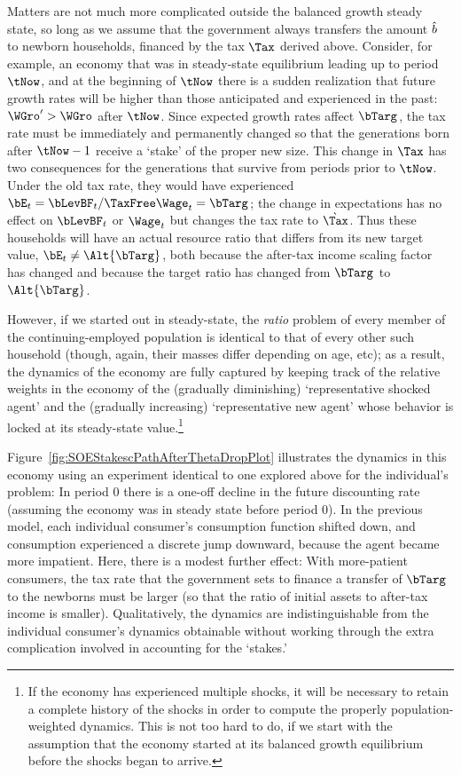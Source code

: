 \documentclass{handout}
\begin{document}
Matters are not much more complicated outside the balanced growth
steady state, so long as we assume that the government always
transfers the amount $\hat{b}^{\null}$ to newborn households, financed by
the tax $\Tax$ derived above.  Consider, for example, an economy that
was in steady-state equilibrium leading up to period $\tNow$, and at
the beginning of $\tNow$ there is a sudden realization that future
growth rates will be higher than those anticipated and experienced in
the past: $\WGro^{\prime} > \WGro$ after $\tNow$.  Since expected
growth rates affect $\bTarg^{\null}$, the tax rate must be immediately and
permanently changed so that the generations born after $\tNow-1$
receive a `stake' of the proper new size.  This change in $\Tax$ has
two consequences for the generations that survive from periods prior
to $\tNow$.  Under the old tax rate, they would have experienced
$\bE_{t} = \bLevBF_{t}/\TaxFree\Wage_{t} = \bTarg^{\null}$; the change in
expectations has no effect on $\bLevBF_{t}$ or $\Wage_{t}$ but changes
the tax rate to $\grave{\Tax}$.  Thus these households will have an
actual resource ratio that differs from its new target value, $\bE_{t}
\neq \Alt{\bTarg}^{\null}$, both because the after-tax income scaling factor
has changed and because the target ratio has changed from $\bTarg^{\null}$
to $\Alt{\bTarg}^{\null}$.

However, if we started out in steady-state, the {\it ratio} problem of every
member of the continuing-employed population is identical to that of every 
other such household (though, again, their masses differ depending on age, etc); as a result, the dynamics of the economy are fully captured
by keeping track of the relative weights in the economy of the (gradually diminishing) `representative shocked agent' and the (gradually increasing) `representative new agent' 
whose behavior is locked at its steady-state value.\footnote{
If the economy has experienced multiple shocks, it will be necessary to
retain a complete history of the shocks in order to compute the properly 
population-weighted dynamics.  This is not too hard to do, if we start with
the assumption that the economy started at its balanced growth equilibrium before the shocks began to arrive.}

Figure~\ref{fig:SOEStakescPathAfterThetaDropPlot} illustrates the
dynamics in this economy using an experiment identical to one explored
above for the individual's problem: In period 0 there is a one-off
decline in the future discounting rate (assuming the economy was in
steady state before period 0).  In the previous model, each individual
consumer's consumption function shifted down, and consumption
experienced a discrete jump downward, because the agent became more
impatient.  Here, there is a modest further effect: With
more-patient consumers, the tax rate that the government sets to finance a transfer
of $\bTarg^{\null}$ to the newborns must be larger (so that the ratio of initial assets to
after-tax income is smaller).  Qualitatively, the
dynamics are indistinguishable from the individual consumer's dynamics
obtainable without working through the extra complication involved in
accounting for the `stakes.'
\end{document}

